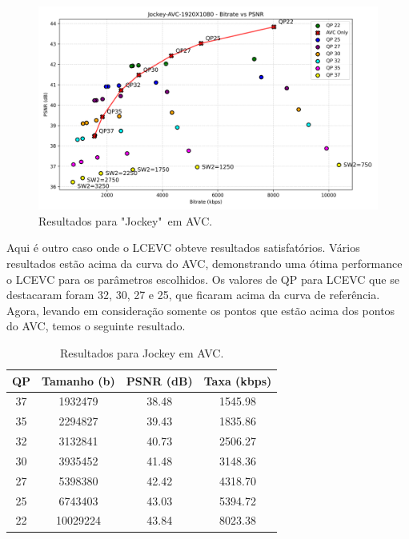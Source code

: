 \begin{figure}[h]
    \centering
    \includegraphics[width=1.0\textwidth]{img/Jockey-AVC.png}
    \caption{Resultados para "Jockey"\ em \acrshort{AVC}. \cite{uvg_dataset}}
    \label{fig:Jockey}
\end{figure}

Aqui é outro caso onde o \acrshort{LCEVC} obteve resultados satisfatórios. Vários resultados
estão acima da curva do \acrshort{AVC}, demonstrando uma ótima performance o \acrshort{LCEVC}
para os parâmetros escolhidos. Os valores de QP para \acrshort{LCEVC} que se destacaram foram
32, 30, 27 e 25, que ficaram acima da curva de referência.
Agora, levando em consideração somente os pontos que estão acima
dos pontos do \acrshort{AVC}, temos o seguinte resultado.

\begin{table}[h]
    \centering
    \begin{tabular}{|c|c|c|c|}
        \hline
        \textbf{QP} & \textbf{Tamanho (b)} & \textbf{PSNR (dB)} & \textbf{Taxa (kbps)} \\
        \hline
        37 & 1932479 & 38.48 & 1545.98 \\
        35 & 2294827 & 39.43 & 1835.86 \\
        32 & 3132841 & 40.73 & 2506.27 \\
        30 & 3935452 & 41.48 & 3148.36 \\
        27 & 5398380 & 42.42 & 4318.70 \\
        25 & 6743403 & 43.03 & 5394.72 \\
        22 & 10029224 & 43.84 & 8023.38 \\
        \hline
    \end{tabular}
    \caption{Resultados para Jockey em AVC.}
    \label{tab:jockey-avc}
\end{table}

